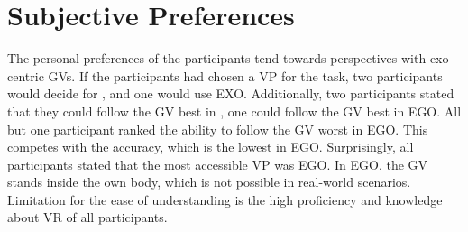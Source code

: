 \section{Subjective Preferences}
The personal preferences of the participants tend towards perspectives with exo-centric GVs. If the participants had chosen a VP for the task, two participants would decide for \combi, and one would use EXO. Additionally, two participants stated that they could follow the GV best in \combi, one could follow the GV best in EGO. All but one participant ranked the ability to follow the GV worst in EGO. This competes with the accuracy, which is the lowest in EGO. Surprisingly, all participants stated that the most accessible VP was EGO. In EGO, the GV stands inside the own body, which is not possible in real-world scenarios. Limitation for the ease of understanding is the high proficiency and knowledge about VR of all participants.
